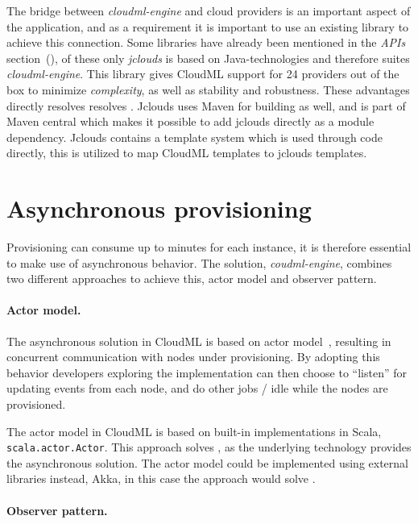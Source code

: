 The bridge between \emph{cloudml-engine} and cloud providers is an important aspect of the application, 
and as a requirement it is important to use an existing library to achieve this connection.
Some libraries have already been mentioned in the \emph{APIs} section~(),
of these only \emph{jclouds} is based on Java-technologies and therefore suites \emph{cloudml-engine}.
This library gives CloudML support for 24 providers out of the box to minimize \emph{complexity},
as well as stability and robustness.
These advantages directly resolves resolves .
Jclouds uses Maven for building as well, and is part of Maven central which makes 
it possible to add jclouds directly as a module dependency.
Jclouds contains a template system which is used through code directly, this is utilized 
to map CloudML templates to jclouds templates.

\section{Asynchronous provisioning}

Provisioning can consume up to minutes for each instance,
it is therefore essential to make use of asynchronous behavior.
The solution, \emph{coudml-engine}, combines two different approaches to achieve this,
actor model and observer pattern.

\paragraph{Actor model.}

The asynchronous solution in CloudML is based on actor model~\cite{actors:haller07},
resulting in concurrent communication with nodes under provisioning.
By adopting this behavior developers exploring the implementation can then choose
to ``listen'' for updating events from each node,
and do other jobs / idle while the nodes are provisioned.

The actor model in CloudML is based on built-in implementations in Scala, 
\texttt{scala.actor.Actor}.
This approach solves ,
as the underlying technology provides the asynchronous solution.
The actor model could be implemented using external libraries instead,
\eg Akka,
in this case the approach would solve .

\paragraph{Observer pattern.}

